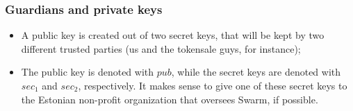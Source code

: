 \documentclass[submission, copyright,creativecommons,sharealike,noncommercial]{eptcs}
\begin{document}
		\subsubsection{Guardians and private keys}
			\begin{itemize}
				\item A public key is created out of two secret keys, that will be kept by two different trusted parties (us and the tokensale guys, for instance);
				
				\item The public key is denoted with $pub$, while the secret keys are denoted with $sec_1$ and $sec_2$, respectively. It makes sense to give one of these secret keys to the Estonian non-profit organization that oversees Swarm, if possible.
				
			\end{itemize}
\end{document}
